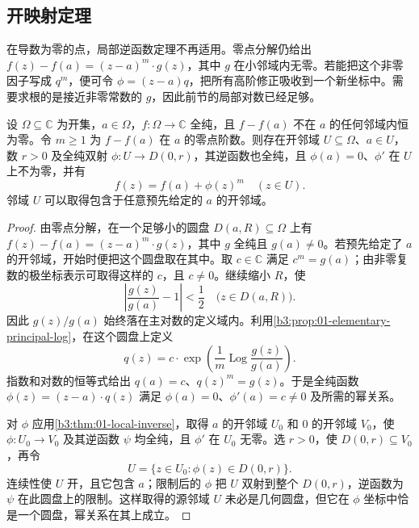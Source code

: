 \subsection{开映射定理}
\label{b3:subsec:010404}

在导数为零的点，局部逆函数定理不再适用。零点分解仍给出
\(f(z)-f(a)=(z-a)^m\cdot g(z)\)，其中 \(g\) 在小邻域内无零。若能把这个非零因子写成 \(q^m\)，便可令 \(\phi=(z-a)q\)，把所有高阶修正吸收到一个新坐标中。需要求根的是接近非零常数的 \(g\)，因此前节的局部对数已经足够。

\begin{proposition}[局部标准形]\label{b3:prop:01-local-normal-form}
设 \(\Omega\subseteq\mathbb C\) 为开集，\(a\in\Omega\)，\(f:\Omega\to\mathbb C\) 全纯，且 \(f-f(a)\) 不在 \(a\) 的任何邻域内恒为零。令 \(m\geq1\) 为 \(f-f(a)\) 在 \(a\) 的零点阶数。则存在开邻域 \(U\subseteq\Omega\)、\(a\in U\)，数 \(r>0\) 及全纯双射 \(\phi:U\to D(0,r)\)，其逆函数也全纯，且 \(\phi(a)=0\)、\(\phi'\) 在 \(U\) 上不为零，并有
\begin{equation}\label{b3:eq:01-local-normal-form}
f(z)=f(a)+\phi(z)^m\quad(z\in U).
\end{equation}
邻域 \(U\) 可以取得包含于任意预先给定的 \(a\) 的开邻域。
\end{proposition}
\begin{proof}
由零点分解，在一个足够小的圆盘 \(D(a,R)\subseteq\Omega\) 上有 \(f(z)-f(a)=(z-a)^m\cdot g(z)\)，其中 \(g\) 全纯且 \(g(a)\neq0\)。若预先给定了 \(a\) 的开邻域，开始时便把这个圆盘取在其中。取 \(c\in\mathbb C\) 满足 \(c^m=g(a)\)；由非零复数的极坐标表示可取得这样的 \(c\)，且 \(c\ne0\)。继续缩小 \(R\)，使
\[
 \left|\frac{g(z)}{g(a)}-1\right|<\frac12
 \quad\bigl(z\in D(a,R)\bigr).
\]
因此 \(g(z)/g(a)\) 始终落在主对数的定义域内。利用\cref{b3:prop:01-elementary-principal-log}，在这个圆盘上定义
\[
 q(z)=c\cdot\exp\left(\frac1m\operatorname{Log}\frac{g(z)}{g(a)}\right).
\]
指数和对数的恒等式给出 \(q(a)=c\)、\(q(z)^m=g(z)\)。于是全纯函数 \(\phi(z)=(z-a)\cdot q(z)\) 满足 \(\phi(a)=0\)、\(\phi'(a)=c\ne0\) 及所需的幂关系。

对 \(\phi\) 应用\cref{b3:thm:01-local-inverse}，取得 \(a\) 的开邻域 \(U_0\) 和 \(0\) 的开邻域 \(V_0\)，使 \(\phi:U_0\to V_0\) 及其逆函数 \(\psi\) 均全纯，且 \(\phi'\) 在 \(U_0\) 无零。选 \(r>0\)，使 \(D(0,r)\subseteq V_0\)，再令
\[
 U=\{z\in U_0:\phi(z)\in D(0,r)\}.
\]
连续性使 \(U\) 开，且它包含 \(a\)；限制后的 \(\phi\) 把 \(U\) 双射到整个 \(D(0,r)\)，逆函数为 \(\psi\) 在此圆盘上的限制。这样取得的源邻域 \(U\) 未必是几何圆盘，但它在 \(\phi\) 坐标中恰是一个圆盘，幂关系在其上成立。
\end{proof}

